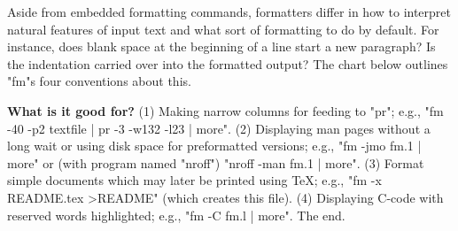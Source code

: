 \noindent  Aside from embedded formatting commands,
formatters differ in how to interpret natural features of
input text and what sort of formatting to do by default.
For instance, does blank space at the beginning of a line
start a new paragraph?  Is the indentation carried over into
the formatted output?  The chart below outlines "fm"s four
conventions about this.

\medskip

{\bf What is it good for?}  (1) Making narrow columns for feeding to
"pr"; e.g., "fm -40 -p2 textfile | pr -3 -w132 -l23 | more".  (2) Displaying
man pages without a long wait or using disk space for preformatted
versions; e.g., "fm -jmo fm.1 | more" or (with program named "nroff")
"nroff -man fm.1 | more".  (3) Format simple documents which may later
be printed using TeX; e.g., "fm -x README.tex >README" (which creates
this file).  (4) Displaying C-code with reserved words highlighted;
e.g., "fm -C fm.l | more".
\bigskip
{}
\bye
The end.
